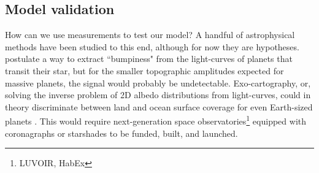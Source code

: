 


\subsection{Model validation}

How can we use measurements to test our model? A handful of astrophysical methods have been studied to this end, although for now they are hypotheses. \citet{McTier2018} postulate a way to extract ``bumpiness" from the light-curves of planets that transit their star, but for the smaller topographic amplitudes expected for massive planets, the signal would probably be undetectable. Exo-cartography, or, solving the inverse problem of 2D albedo distributions from light-curves, could in theory discriminate between land and ocean surface coverage for even Earth-sized planets \citep{Cowan2018, Farr2018, Kawahara2020, Aizawa2020}. This would require next-generation space observatories\footnote{LUVOIR, HabEx} equipped with coronagraphs or starshades to be funded, built, and launched.

